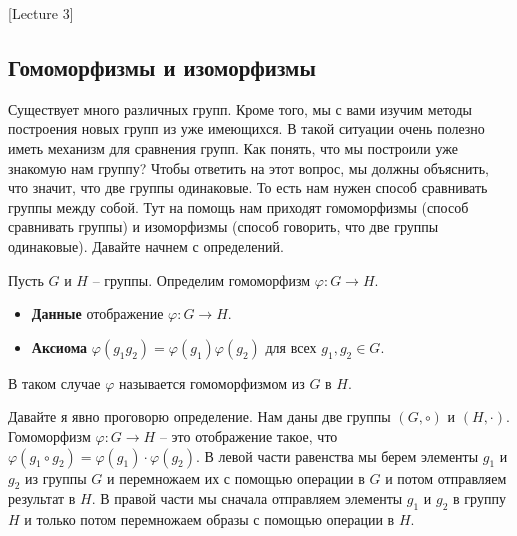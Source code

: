 [Lecture 3]


\subsection{Гомоморфизмы и изоморфизмы}

Существует много различных групп.
Кроме того, мы с вами изучим методы построения новых групп из уже имеющихся.
В такой ситуации очень полезно иметь механизм для сравнения групп.
Как понять, что мы построили уже знакомую нам группу?
Чтобы ответить на этот вопрос, мы должны объяснить, что значит, что две группы одинаковые.
То есть нам нужен способ сравнивать группы между собой.
Тут на помощь нам приходят гомоморфизмы (способ сравнивать группы) и изоморфизмы (способ говорить, что две группы одинаковые).
Давайте начнем с определений.

\begin{definition}
Пусть $G$ и $H$ -- группы.
Определим гомоморфизм $\varphi\colon G\to H$.
\begin{itemize}
\item \textbf{Данные} отображение $\varphi\colon G\to H$.

\item \textbf{Аксиома} $\varphi(g_1g_2) = \varphi(g_1) \varphi(g_2)$ для всех $g_1,g_2\in G$.
\end{itemize}
В таком случае $\varphi$ называется гомоморфизмом из $G$ в $H$.
\end{definition}

\begin{remark}
Давайте я явно проговорю определение.
Нам даны две группы $(G, \circ)$ и $(H,\cdot)$.
Гомоморфизм $\varphi \colon G\to H$ -- это отображение такое, что $\varphi(g_1 \circ g_2) = \varphi(g_1) \cdot \varphi(g_2)$.
В левой части равенства мы берем элементы $g_1$ и $g_2$ из группы $G$ и перемножаем их с помощью операции в $G$ и потом отправляем результат в $H$.
В правой части мы сначала отправляем элементы $g_1$ и $g_2$ в группу $H$ и только потом перемножаем образы с помощью операции в $H$.
\end{remark}

